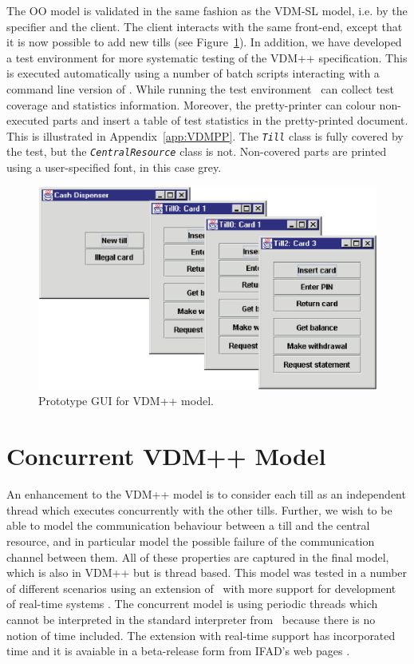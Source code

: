 \documentclass[\pformat,12pt,twoside]{article}
\begin{document}
The OO model is validated in the same fashion as the VDM-SL model, 
i.e. by the specifier and the client. The client interacts with 
the same front-end, except that it is now possible to add new 
tills (see Figure~\ref{fig:ppscreen}). In addition, we have developed a test environment for 
more systematic testing of the VDM++ specification. This is executed 
automatically using a number of batch scripts interacting with 
a command line version of \vdmtools. While running 
the test environment \vdmtools\  can collect test 
coverage and statistics information. Moreover, the pretty-printer 
can colour non-executed parts and insert a table of test statistics in 
the pretty-printed document. This is illustrated in
Appendix~\ref{app:VDMPP}.
The \texttt{\emph{Till}} class is fully covered by the test, but the
\texttt{\emph{CentralResource}}
class is not. Non-covered parts are printed using a user-specified
font, in this case grey. 


\begin{figure}[htbp]
\begin{center}
\includegraphics[width=.9\textwidth]{ppscreen}
\caption{Prototype GUI for VDM++ model.\label{fig:ppscreen}}
\end{center}
\end{figure}

\section{Concurrent VDM++ Model}\label{sec:Concur}


An enhancement to the VDM++ model is to consider each till as an
independent thread which executes concurrently with the other
tills. Further, we wish to be able to model the communication
behaviour between a till and the central resource, and in particular
model the possible failure of the communication channel between
them. All of these properties are captured in the final model, which
is also in VDM++ but is thread based. This model was tested in a
number of different scenarios using an extension of \vdmtools\ with
more support for development of real-time systems
\cite{GuidelinesRT,Mukherjee&00}.  The concurrent model is using
periodic threads which cannot be interpreted in the standard
interpreter from \vdmtools\ because there is no notion of time
included. The extension with real-time support has incorporated time
and it is avaiable in a beta-release form from IFAD's web pages
\cite{IFADweb}.
\end{document}
